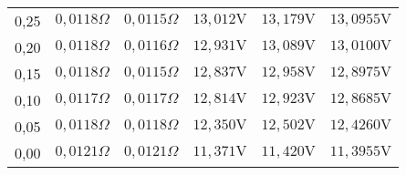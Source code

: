 \begin{tabular}{|c|c|c|c|c|c|}
0,25 & $0,0118\Omega$ & $0,0115\Omega$ & $13,012\mathrm{V}$ & $13,179\mathrm{V}$ & $13,0955\mathrm{V}$\\ 
0,20 & $0,0118\Omega$ & $0,0116\Omega$ & $12,931\mathrm{V}$ & $13,089\mathrm{V}$ & $13,0100\mathrm{V}$\\ 
0,15 & $0,0118\Omega$ & $0,0115\Omega$ & $12,837\mathrm{V}$ & $12,958\mathrm{V}$ & $12,8975\mathrm{V}$\\ 
0,10 & $0,0117\Omega$ & $0,0117\Omega$ & $12,814\mathrm{V}$ & $12,923\mathrm{V}$ & $12,8685\mathrm{V}$\\ 
0,05 & $0,0118\Omega$ & $0,0118\Omega$ & $12,350\mathrm{V}$ & $12,502\mathrm{V}$ & $12,4260\mathrm{V}$\\ 
0,00 & $0,0121\Omega$ & $0,0121\Omega$ & $11,371\mathrm{V}$ & $11,420\mathrm{V}$ & $11,3955\mathrm{V}$\\
	\hline
\end{tabular}
